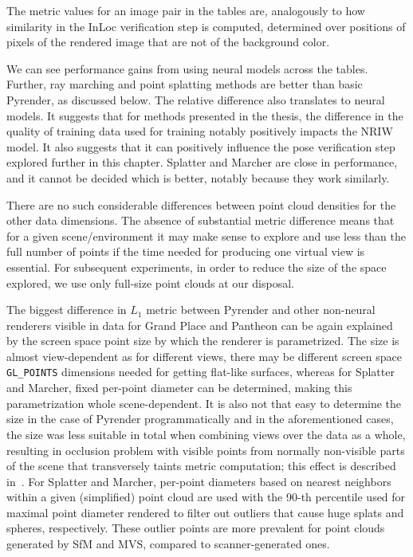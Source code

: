 The metric values for an image pair in the tables are, analogously to
how similarity in the InLoc verification step is computed, determined over
positions of pixels of the rendered image that are not
of the background color.

We can see performance gains from using neural models across the tables.
Further, ray marching and point splatting methods are better than basic
Pyrender, as discussed below. The relative difference also translates to
neural models. It suggests that for methods presented in the thesis, the
difference in the quality of training data used for training notably
positively impacts the NRIW model. It also suggests that it can positively
influence the pose verification step explored further in this chapter.
Splatter and Marcher are close in performance, and it cannot be
decided which is better, notably because they work similarly.

There are no such considerable differences between point cloud densities
for the other data dimensions. The absence of substantial metric difference
means that for a given scene/environment it may make sense to explore and use
less than the full number of points if the time needed for producing one virtual
view is essential. For subsequent experiments, in order to reduce the size of
the space explored, we use only full-size point clouds at our disposal.

The biggest difference in $L_1$ metric between Pyrender and other non-neural
renderers visible in data for Grand Place and Pantheon can be again explained
by the screen space point size by which the renderer is parametrized. The size
is almost view-dependent as for different views, there may be different screen
space \verb|GL_POINTS| dimensions needed for getting flat-like surfaces, whereas
for Splatter and Marcher, fixed per-point diameter can be determined, making this
parametrization whole scene-dependent. It is also not that easy to determine
the size in the case of Pyrender programmatically and in the aforementioned
cases, the size was less suitable in total when combining views over the data
as a whole, resulting in occlusion problem with visible points from normally
non-visible parts of the scene that transversely taints metric computation;
this effect is described in~. For Splatter and Marcher,
per-point diameters based on nearest neighbors within a given (simplified) point
cloud are used with the 90-th percentile used for maximal point diameter rendered
to filter out outliers that cause huge splats and spheres, respectively. These
outlier points are more prevalent for point clouds generated by SfM and MVS,
compared to scanner-generated ones.\\

